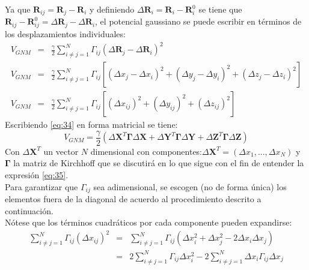 Ya que $\textbf{R}_{ij}=\textbf{R}_{j}-\textbf{R}_{i}$ y definiendo $\Delta\textbf{R}_{i}=\textbf{R}_{i}-\textbf{R}_{i}^0$ se tiene que  $\textbf{R}_{ij}-\textbf{R}_{ij}^0=\Delta\textbf{R}_{j}-\Delta\textbf{R}_{i}$, el potencial gaussiano se puede escribir en t\'{e}rminos de los desplazamientos individuales:
\begin{eqnarray}\label{eq:34}
V_{GNM}&=&\frac{\gamma}{2}\sum_{i\neq j=1}^{N}\Gamma_{ij}\left( \Delta\textbf{R}_{j}-\Delta\textbf{R}_{i}\right)^2 \nonumber \\
V_{GNM}&=&\frac{\gamma}{2}\sum_{i\neq j=1}^{N}\Gamma_{ij}\left[\left(\Delta x_j-\Delta x_i \right)^2+\left(\Delta y_j-\Delta y_i \right)^2+\left(\Delta z_j-\Delta z_i \right)^2 \right] \nonumber \\
V_{GNM}&=&\frac{\gamma}{2}\sum_{i\neq j=1}^{N}\Gamma_{ij}\left[\left(\Delta x_{ij}\right)^2+\left(\Delta y_{ij}\right)^2+\left(\Delta z_{ij}\right)^2 \right]
\end{eqnarray}
Escribiendo \eqref{eq:34} en forma matricial se tiene:
\begin{equation}\label{eq:35}
V_{GNM}=\frac{\gamma}{2}\left(\Delta\mathbf{X}^T\mathbf{\Gamma}\Delta\mathbf{X}+\Delta\mathbf{Y}^T\mathbf{\Gamma}\Delta\mathbf{Y}+\Delta\mathbf{Z}^T\mathbf{\Gamma}\Delta\mathbf{Z} \right)
\end{equation}
Con $\Delta\mathbf{X}^T$ un vector $N$ dimensional con componentes:$\Delta\mathbf{X}^T=\left(\Delta x_1,...,\Delta x_N\right)$ y $\mathbf{\Gamma}$ la matriz de Kirchhoff que se discutir\'{a} en lo que sigue con el fin de entender la expresi\'{o}n \eqref{eq:35}.\\

Para garantizar que $\Gamma_{ij}$ sea adimensional, se escogen (no de forma \'{u}nica) los elementos fuera de la diagonal de acuerdo al procedimiento descrito a continuaci\'{o}n.\\

N\'{o}tese que los t\'{e}rminos cuadr\'{a}ticos por cada componente pueden expandirse:
\begin{eqnarray}\label{eq:36}
\sum_{i\neq j=1}^{N}\Gamma_{ij}\left(\Delta x_{ij}\right)^2&=&\sum_{i\neq j=1}^{N}\Gamma_{ij}\left(\Delta x_{i}^2+\Delta x_{j}^2-2\Delta x_{i}\Delta x_{j}\right) \nonumber \\
&=&2\sum_{i\neq j=1}^{N}\Gamma_{ij}\Delta x_{i}^2-2\sum_{i\neq j=1}^{N}\Delta x_{i}\Gamma_{ij}\Delta x_{j}
\end{eqnarray}

